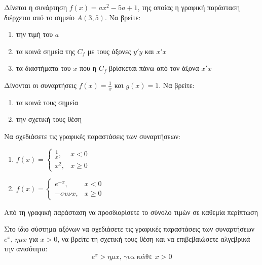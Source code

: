 \documentclass{presentation}
\begin{document}
\begin{askisi}
  Δίνεται η συνάρτηση $f(x)=ax^2-5a+1$, της οποίας η γραφική παράσταση διέρχεται από το σημείο $Α(3,5)$. Να βρείτε:
  \begin{enumerate}
    \item<1-> την τιμή του $a$
    \item<2-> τα κοινά σημεία της $C_f$ με τους άξονες $y'y$ και $x'x$
    \item<3-> τα διαστήματα του $x$ που η $C_f$ βρίσκεται πάνω από τον άξονα $x'x$
  \end{enumerate}
\end{askisi}

\begin{askisi}
  Δίνονται οι συναρτήσεις $f(x)=\frac{1}{x}$ και $g(x)=1$. Να βρείτε:
  \begin{enumerate}
    \item<1-> τα κοινά τους σημεία
    \item<2-> την σχετική τους θέση
  \end{enumerate}
\end{askisi}

\begin{askisi}
  Να σχεδιάσετε τις γραφικές παραστάσεις των συναρτήσεων:
  \begin{enumerate}
    \item<1->
          $f(x)=
            \begin{cases}
              \frac{1}{x}, & x<0    \\
              x^2,         & x\ge 0
            \end{cases}$

    \item<2-> $f(x)=
            \begin{cases}
              e^{-x}, & x<0    \\
              -συν x, & x\ge 0
            \end{cases}$
  \end{enumerate}
  Από τη γραφική παράσταση να προσδιορίσετε το σύνολο τιμών σε καθεμία περίπτωση
\end{askisi}

\begin{askisi}
  Στο ίδιο σύστημα αξόνων να σχεδιάσετε τις γραφικές παραστάσεις των συναρτήσεων $e^x$, $ημ x$ για $x>0$, να βρείτε τη σχετική τους θέση και να επιβεβαιώσετε αλγεβρικά την ανισότητα:
  $$e^x>ημ x \text{, για κάθε } x>0$$
\end{askisi}
\end{document}
